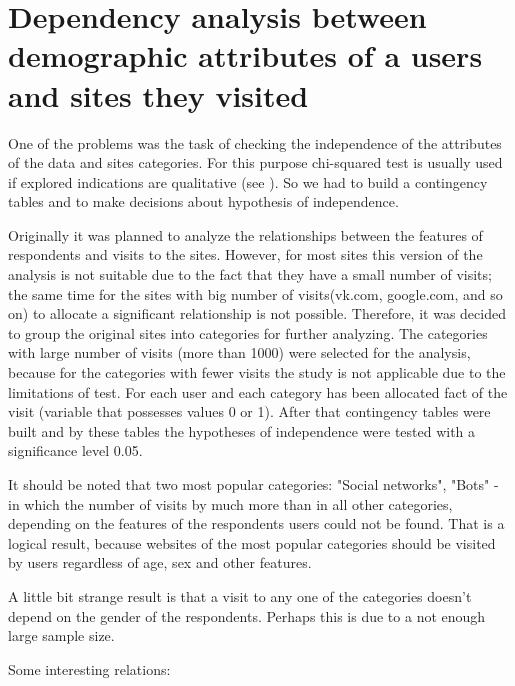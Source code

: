 \documentclass[runningheads,a4paper]{llncs}
\begin{document}
\section{Dependency analysis between demographic attributes of a users and sites they visited}



One of the problems was the task of checking the independence of the attributes of the data and sites categories. For this purpose chi-squared test is usually used if explored indications are qualitative (see \cite{wiki_chisq}). So we had to build a contingency tables and to make decisions about hypothesis of independence.

Originally it was planned to analyze the relationships between the features of respondents and visits to the sites. However, for most sites this version of the analysis is not suitable due to the fact that they have a small number of visits; the same time for the sites with big number of visits(vk.com, google.com, and so on) to allocate a significant relationship is not possible. Therefore, it was decided to group the original sites into categories for further analyzing. The categories with large number of visits (more than 1000) were selected for the analysis, because for the categories with fewer visits the study is not applicable due to the limitations of test. For each user and each category has been allocated fact of the visit (variable that possesses values 0 or 1). After that contingency tables were built and by these tables the hypotheses of independence were tested with a significance level 0.05.

It should be noted that two most popular categories: "Social networks", "Bots" - in which the number of visits by much more than in all other categories, depending on the features of the respondents users could not be found. That is a logical result, because websites of the most popular categories should be visited by users regardless of age, sex and other features. 

A little bit strange result is that a visit to any one of the categories doesn’t depend on the gender of the respondents. Perhaps this is due to a not enough large sample size.

Some interesting relations:
\end{document}
